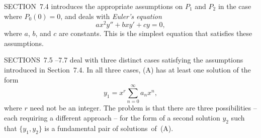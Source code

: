 \medskip
\noindent
SECTION~7.4 introduces the appropriate assumptions on $P_{1}$ and $P_{2}$ in the case where
$P_{0}(0)=0$, and deals with {\color{blue}\it Euler's equation\/}
\[
  ax^{2}y''+bxy'+cy=0,
\]
where $a$, $b$, and $c$ are constants. This is the simplest equation that satisfies these
assumptions.

\medskip
\noindent
SECTIONS~7.5 --7.7 deal with three distinct cases satisfying the assumptions introduced in
Section~7.4. In all three cases, (A) has at least one solution of the form
\[
  y_{1}=x^{r}\sum_{n=0}^{\infty}a_{n}x^{n},
\]
where $r$ need not be an integer. The problem is that there are three possibilities -- each
requiring a different approach -- for the form of a second solution $y_{2}$ such that
$\{y_{1},y_{2}\}$ is a fundamental pair of solutions~of~(A).

\newpage














